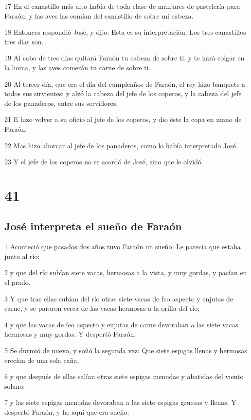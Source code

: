 17 En el canastillo más alto había de toda clase de manjares de pastelería para Faraón; y las aves las comían del canastillo de sobre mi cabeza.

18 Entonces respondió José, y dijo: Esta es su interpretación: Los tres canastillos tres días son.

19 Al cabo de tres días quitará Faraón tu cabeza de sobre ti, y te hará colgar en la horca, y las aves comerán tu carne de sobre ti.

20 Al tercer día, que era el día del cumpleaños de Faraón, el rey hizo banquete a todos sus sirvientes; y alzó la cabeza del jefe de los coperos, y la cabeza del jefe de los panaderos, entre sus servidores.

21 E hizo volver a su oficio al jefe de los coperos, y dio éste la copa en mano de Faraón.

22 Mas hizo ahorcar al jefe de los panaderos, como lo había interpretado José.

23 Y el jefe de los coperos no se acordó de José, sino que le olvidó.

\chapter{41}

\section{José interpreta el sueño de Faraón}

1 Aconteció que pasados dos años tuvo Faraón un sueño. Le parecía que estaba junto al río;

2 y que del río subían siete vacas, hermosas a la vista, y muy gordas, y pacían en el prado.

3 Y que tras ellas subían del río otras siete vacas de feo aspecto y enjutas de carne, y se pararon cerca de las vacas hermosas a la orilla del río;

4 y que las vacas de feo aspecto y enjutas de carne devoraban a las siete vacas hermosas y muy gordas. Y despertó Faraón.

5 Se durmió de nuevo, y soñó la segunda vez: Que siete espigas llenas y hermosas crecían de una sola caña,

6 y que después de ellas salían otras siete espigas menudas y abatidas del viento solano;

7 y las siete espigas menudas devoraban a las siete espigas gruesas y llenas. Y despertó Faraón, y he aquí que era sueño.

